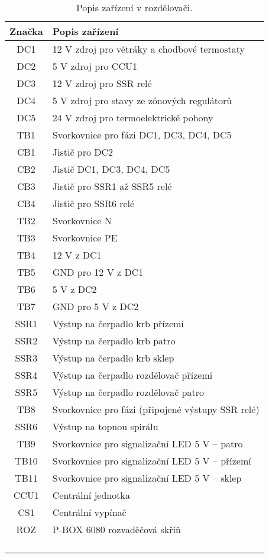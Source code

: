 \begin{Czech}
\begin{table}[H]
\centering
\begin{tabular}{|| c || l ||} 
 \hline
 Značka & Popis zařízení \\ 
 \hline\hline
 DC1 & 12 V zdroj pro větráky a chodbové termostaty\\ 
 \hline
 DC2 & 5 V zdroj pro CCU1\\ 
 \hline
 DC3 & 12 V zdroj pro SSR relé\\ 
 \hline
 DC4 & 5 V zdroj pro stavy ze zónových regulátorů\\ 
 \hline
 DC5 & 24 V zdroj pro termoelektrické pohony\\ 
 \hline
 TB1 & Svorkovnice pro fázi DC1, DC3, DC4, DC5\\ 
 \hline
 CB1 & Jistič pro DC2\\ 
 \hline
 CB2 & Jistič DC1, DC3, DC4, DC5\\ 
 \hline
 CB3 & Jistič pro SSR1 až SSR5 relé\\ 
 \hline
 CB4 & Jistič pro SSR6 relé\\ 
 \hline
 TB2 & Svorkovnice N\\ 
 \hline
 TB3 & Svorkovnice PE\\ 
 \hline
 TB4 & 12 V z DC1\\
 \hline
 TB5 & GND pro 12 V z DC1\\ 
 \hline
 TB6 & 5 V z DC2\\ 
 \hline
 TB7 & GND pro 5 V z DC2\\  
 \hline 
 SSR1 & Výstup na čerpadlo krb přízemí\\ 
 \hline
 SSR2 & Výstup na čerpadlo krb patro\\ 
 \hline
 SSR3 & Výstup na čerpadlo krb sklep\\
 \hline
 SSR4 & Výstup na čerpadlo rozdělovač přízemí\\ 
 \hline
 SSR5 & Výstup na čerpadlo rozdělovač patro\\  
 \hline
 TB8 & Svorkovnice pro fázi (připojené výstupy SSR relé) \\ 
 \hline
 SSR6 & Výstup na topnou spirálu\\ 
 \hline
 TB9 & Svorkovnice pro signalizační LED 5 V – patro\\
 \hline
 TB10 & Svorkovnice pro signalizační LED 5 V – přízemí \\
 \hline
 TB11 & Svorkovnice pro signalizační LED 5 V – sklep \\
 \hline
 CCU1 & Centrální jednotka\\
 \hline
 CS1 & Centrální vypínač\\
 \hline
 ROZ & P-BOX 6080 rozvaděčová skříň\\
 \hline
  & \\
 \hline
  & \\
 \hline
  & \\
 \hline
  & \\
 \hline
\end{tabular}
\caption{Popis zařízení v rozdělovači.}
\label{tab:description-of-devices-in-electric-switchboard}
\end{table}
\end{Czech}
